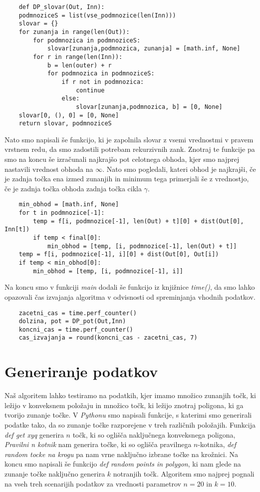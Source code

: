 \documentclass[a4paper, 11pt]{article}
\begin{document}
\begin{verbatim}
    def DP_slovar(Out, Inn):
    podmnoziceS = list(vse_podmnozice(len(Inn)))
    slovar = {}
    for zunanja in range(len(Out)):
        for podmnozica in podmnoziceS:
            slovar[zunanja,podmnozica, zunanja] = [math.inf, None]
        for r in range(len(Inn)):
            b = len(outer) + r
            for podmnozica in podmnoziceS:
                if r not in podmnozica:
                    continue
                else:
                    slovar[zunanja,podmnozica, b] = [0, None]
    slovar[0, (), 0] = [0, None]
    return slovar, podmnoziceS
\end{verbatim}

Nato smo napisali še funkcijo, ki je zapolnila slovar z vsemi vrednostmi v pravem vrstnem redu, 
da smo zadostili potrebam rekurzivnih zank. Znotraj te funkcije pa smo na koncu še izračunali 
najkrajšo pot celotnega obhoda, kjer smo najprej nastavili vrednost obhoda na $\infty$. Nato smo 
pogledali, kateri obhod je najkrajši, če je zadnja točka ena izmed zunanjih in minimum tega primerjali še z vrednostjo,
če je zadnja točka obhoda zadnja točka cikla $\gamma$.

\begin{verbatim}
    min_obhod = [math.inf, None]
    for t in podmnozice[-1]:
        temp = f[i, podmnozice[-1], len(Out) + t][0] + dist(Out[0], Inn[t])
        if temp < final[0]:
            min_obhod = [temp, [i, podmnozice[-1], len(Out) + t]]
    temp = f[i, podmnozice[-1], i][0] + dist(Out[0], Out[i])
    if temp < min_obhod[0]:
        min_obhod = [temp, [i, podmnozice[-1], i]]
\end{verbatim}

Na koncu smo v funkciji \emph{main} dodali še funkcijo iz knjižnice \emph{time()}, da smo lahko 
opazovali čas izvajanja algoritma v odvisnosti od spreminjanja vhodnih podatkov.

\begin{verbatim}
    zacetni_cas = time.perf_counter()
    dolzina, pot = DP_pot(Out,Inn)
    koncni_cas = time.perf_counter()
    cas_izvajanja = round(koncni_cas - zacetni_cas, 7)
\end{verbatim}

\section{Generiranje podatkov}

Naš algoritem lahko testiramo na podatkih, kjer imamo množico zunanjih točk, ki ležijo v konveksnem položaju in množico 
točk, ki ležijo znotraj poligona, ki ga tvorijo zunanje točke. V \emph{Pythonu} smo napisali funkcije, s katerimi smo 
generirali podatke tako, da so zunanje točke razporejene v treh različnih položajih. Funkcija \emph{def get xyq} 
generira $n$ točk, ki so oglišča naključnega konveksnega poligona, \emph{Pravilni n kotnik} nam generira točke, ki so 
oglišča pravilnega $n$-kotnika, \emph{def random tocke na krogu} pa nam vrne naključno izbrane točke na krožnici. Na 
koncu smo napisali še funkcijo \emph{def random points in polygon}, ki nam glede na zunanje točke naključno generira $k$ 
notranjih točk. Algoritem smo najprej pognali na vseh treh scenarijih podatkov za vrednosti parametrov $n=20$ in $k=10$.
\end{document}
